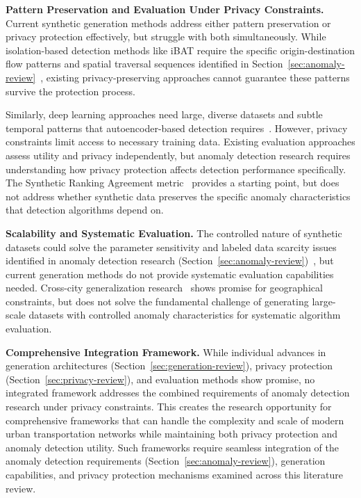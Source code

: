 \documentclass[runningheads]{llncs}
\begin{document}
\textbf{Pattern Preservation and Evaluation Under Privacy Constraints.} Current synthetic generation methods address either pattern preservation or privacy protection effectively, but struggle with both simultaneously. While isolation-based detection methods like iBAT require the specific origin-destination flow patterns and spatial traversal sequences identified in Section~\ref{sec:anomaly-review}~\cite{zhang2019ibat}, existing privacy-preserving approaches cannot guarantee these patterns survive the protection process.

Similarly, deep learning approaches need large, diverse datasets and subtle temporal patterns that autoencoder-based detection requires~\cite{huang2021lstm}. However, privacy constraints limit access to necessary training data. Existing evaluation approaches assess utility and privacy independently, but anomaly detection research requires understanding how privacy protection affects detection performance specifically. The Synthetic Ranking Agreement metric~\cite{jordon2019pate} provides a starting point, but does not address whether synthetic data preserves the specific anomaly characteristics that detection algorithms depend on.

\textbf{Scalability and Systematic Evaluation.} The controlled nature of synthetic datasets could solve the parameter sensitivity and labeled data scarcity issues identified in anomaly detection research (Section~\ref{sec:anomaly-review})~\cite{zhang2019ibat}, but current generation methods do not provide systematic evaluation capabilities needed. Cross-city generalization research~\cite{wang2025gtg} shows promise for geographical constraints, but does not solve the fundamental challenge of generating large-scale datasets with controlled anomaly characteristics for systematic algorithm evaluation.

\textbf{Comprehensive Integration Framework.} While individual advances in generation architectures (Section~\ref{sec:generation-review}), privacy protection (Section~\ref{sec:privacy-review}), and evaluation methods show promise, no integrated framework addresses the combined requirements of anomaly detection research under privacy constraints. This creates the research opportunity for comprehensive frameworks that can handle the complexity and scale of modern urban transportation networks while maintaining both privacy protection and anomaly detection utility. Such frameworks require seamless integration of the anomaly detection requirements (Section~\ref{sec:anomaly-review}), generation capabilities, and privacy protection mechanisms examined across this literature review.
\end{document}
